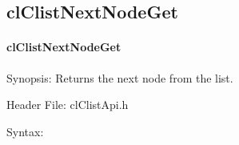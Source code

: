 \begin{flushleft}
\subsection{clClistNextNodeGet}
\hypertarget{pagecl109}{}\paragraph{cl\-Clist\-Next\-Node\-Get}\label{pagecl109}
\begin{Desc}
\item[Synopsis:]Returns the next node from the list.\end{Desc}
\begin{Desc}
\item[Header File:]clClistApi.h\end{Desc}
\begin{Desc}
\item[Syntax:]


\end{Desc}
\end{flushleft}
